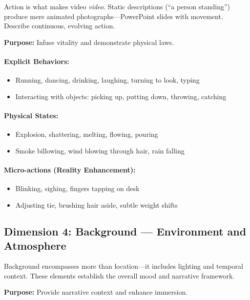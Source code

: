 Action is what makes video \textit{video}. Static descriptions (``a person standing'') produce mere animated photographs---PowerPoint slides with movement. Describe continuous, evolving action.

\textbf{Purpose:} Infuse vitality and demonstrate physical laws.

\paragraph{Explicit Behaviors:}
\begin{itemize}
    \item Running, dancing, drinking, laughing, turning to look, typing
    \item Interacting with objects: picking up, putting down, throwing, catching
\end{itemize}

\paragraph{Physical States:}
\begin{itemize}
    \item Explosion, shattering, melting, flowing, pouring
    \item Smoke billowing, wind blowing through hair, rain falling
\end{itemize}

\paragraph{Micro-actions (Reality Enhancement):}
\begin{itemize}
    \item Blinking, sighing, fingers tapping on desk
    \item Adjusting tie, brushing hair aside, subtle weight shifts
\end{itemize}

\subsection{Dimension 4: Background --- Environment and Atmosphere}
\label{subsec:dim-background}

Background encompasses more than location---it includes lighting and temporal context. These elements establish the overall mood and narrative framework.

\textbf{Purpose:} Provide narrative context and enhance immersion.

